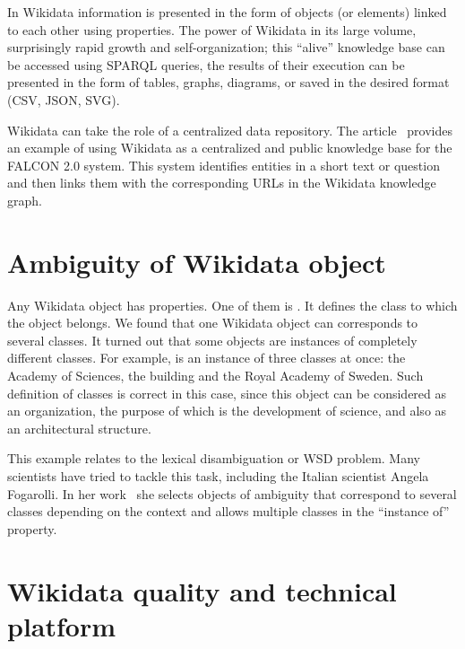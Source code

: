 In Wikidata information is presented in the form of objects (or elements) 
linked to each other using properties. The power of Wikidata in its large volume, surprisingly rapid growth and self-organization; 
this ``alive'' knowledge base can be accessed using SPARQL queries, 
the results of their execution can be presented 
in the form of tables, graphs, diagrams, or saved in the desired format (CSV, JSON, SVG).

Wikidata can take the role of a centralized data repository. 
The article~ provides an example of using Wikidata 
as a centralized and public knowledge base for the FALCON 2.0 system. 
This system identifies entities in a short text or question 
and then links them with the corresponding URLs in the Wikidata knowledge graph.

\section{Ambiguity of Wikidata object}
Any Wikidata object has properties. One of them is . It defines the class to which the object belongs. 
We found that one Wikidata object can corresponds to several classes. 
It turned out that some objects are instances of completely different classes. For example,  is an instance of three classes at once: the Academy of Sciences, the building and the Royal Academy of Sweden. Such definition of classes is correct in this case, since this object can be considered as an organization, the purpose of which is the development of science, and also as an architectural structure.

This example relates to the lexical disambiguation or WSD problem. Many scientists have tried to tackle this task, including the Italian scientist Angela Fogarolli. In her work~ she selects objects of ambiguity that correspond to several classes depending on the context and allows multiple classes in the ``instance of'' property.


\section{Wikidata quality and technical platform}

